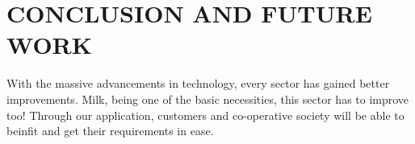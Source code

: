\chapter{\uppercase{Conclusion and Future Work}}
\label{chap:conclusion}
With the massive advancements in technology, every sector has gained better improvements. Milk, being one of the basic necessities, this sector has to improve too! 
Through our application, customers and co-operative society will be able to beinfit and get their requirements in ease. 